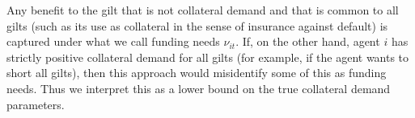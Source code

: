 Any benefit to the gilt that is not collateral demand and that is common to all gilts (such as its use as collateral in the sense of insurance against default) is captured under what we call funding needs $\nu_{it}$. If, on the other hand, agent $i$ has strictly positive collateral demand for all gilts (for example, if the agent wants to short all gilts), then this approach would misidentify some of this as funding needs. Thus we interpret this as a lower bound on the true collateral demand parameters.




